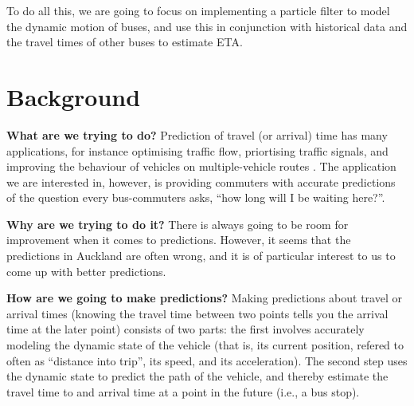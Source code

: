 \documentclass[12pt,a4paper]{article}
\begin{document}
To do all this, we are going to focus on implementing a particle filter to model the dynamic motion of buses,
and use this in conjunction with historical data and the travel times of other buses to estimate ETA.



\section{Background}
\label{sec:background}











\textbf{What are we trying to do? }
Prediction of travel (or arrival) time has many applications,
for instance optimising traffic flow, priortising traffic signals,
and improving the behaviour of vehicles on multiple-vehicle routes
\citep{hans-etal:2015}.
The application we are interested in, however, is providing commuters with accurate predictions of 
the question every bus-commuters asks, ``how long will I be waiting here?''.


\textbf{Why are we trying to do it?}
There is always going to be room for improvement when it comes to predictions.
However, it seems that the predictions in Auckland are often wrong,
and it is of particular interest to us to come up with better predictions.



\textbf{How are we going to make predictions?}
Making predictions about travel or arrival times (knowing the travel time between two points
tells you the arrival time at the later point) consists of two parts:
the first involves accurately modeling the dynamic state of the vehicle
(that is, its current position, refered to often as ``distance into trip'', its speed,
and its acceleration).
The second step uses the dynamic state to predict the path of the vehicle,
and thereby estimate the travel time to and arrival time at a point in the future (i.e., a bus stop).
\end{document}
